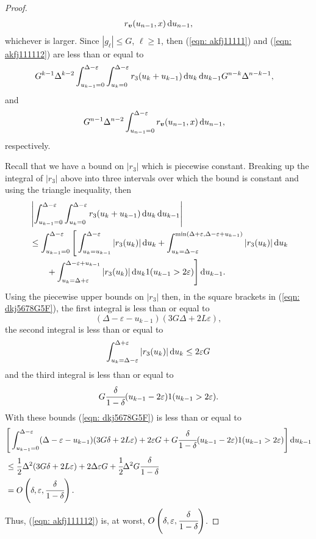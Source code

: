 \begin{proof}
\begin{align}
            	 r_{\boldsymbol v}(u_{n-1},x)\, \mathrm{d} u_{n-1},\label{eqn: akfj11111}
	\end{align} 
	whichever is larger. Since \(|g_\ell|\leq G\), \(\ell \geq 1\), then (\ref{eqn: akfj11111}) and (\ref{eqn: akfj111112}) are less than or equal to 
	\begin{align*}
		& G^{k-1} \Delta^{k-2} \int_{u_{k-1}=0}^{\Delta-\varepsilon}
		\int_{u_k=0}^{\Delta-\varepsilon }r_3(u_{k}+u_{k-1}) \, \mathrm{d} u_k \, \mathrm{d} u_{k-1} G^{n-k}\Delta^{n-k-1},
	\end{align*}
	and 
	\begin{align*}
		&G^{n-1} \Delta^{n-2} \int_{u_{n-1}=0}^{\Delta-\varepsilon}
		 r_{\boldsymbol v}(u_{n-1},x) \, \mathrm{d} u_{n-1},
	\end{align*} 
	respectively. 

	Recall that we have a bound on \(|r_3|\) which is piecewise constant. Breaking up the integral of \(|r_3|\) above into three intervals over which the bound is constant and using the triangle inequality, then
	\begin{align}
		 \nonumber &\left|\int_{u_{k-1}=0}^{\Delta-\varepsilon}\int_{u_k=0}^{\Delta-\varepsilon}r_3(u_{k}+u_{k-1}) \, \mathrm{d} u_k \, \mathrm{d} u_{k-1} \right|
		\\\nonumber & \leq \int_{u_{k-1}=0}^{\Delta-\varepsilon}\Bigg[ \int_{u_k=u_{k-1}}^{\Delta-\varepsilon} | r_3(u_k) |\, \mathrm{d} u_k + \int_{u_k=\Delta-\varepsilon}^{\min(\Delta+\varepsilon,\Delta-\varepsilon+u_{k-1})} |r_3(u_k)|\, \mathrm{d} u_k 
		\\&\qquad{}+ \int_{u_k = \Delta+\varepsilon}^{\Delta-\varepsilon+u_{k-1}} |r_3(u_{k})|\, \mathrm{d} u_k1(u_{k-1}>2\varepsilon)\Bigg] \, \mathrm{d} u_{k-1}.\label{eqn: dkj5678G5F}
	\end{align}
	Using the piecewise upper bounds on \(|r_3|\) then, in the square brackets in (\ref{eqn: dkj5678G5F}), the first integral is less than or equal to 
	\[(\Delta-\varepsilon-u_{k-1})(3G\Delta +2L\varepsilon),\]
	the second integral is less than or equal to 
	\[\int_{u_k=\Delta-\varepsilon}^{\Delta+\varepsilon} |r_3(u_k)|\, \mathrm{d} u_k \leq 2\varepsilon G \]
	and the third integral is less than or equal to 
	\[G\cfrac{\delta}{1-\delta}(u_{k-1}-2\varepsilon)1(u_{k-1}>2\varepsilon).\]
	With these bounds (\ref{eqn: dkj5678G5F}) is less than or equal to
	\begin{align*}
		&\Bigg[\int_{u_{k-1}=0}^{\Delta-\varepsilon} (\Delta-\varepsilon-u_{k-1})(3G\delta+2L\varepsilon)+ 2\varepsilon G 
		+ G\cfrac{\delta}{1-\delta}(u_{k-1}-2\varepsilon)1(u_{k-1}>2\varepsilon) \Bigg]\, \mathrm{d} u_{k-1}
		\\& \leq \frac{1}{2}\Delta^2(3G\delta+2L\varepsilon)+ 2\Delta\varepsilon G 
		+ \cfrac{1}{2}\Delta^2G\cfrac{\delta}{1-\delta} 
		\\&=O\left(\delta,\varepsilon,\cfrac{\delta}{1-\delta}\right).
	\end{align*}
	Thus, (\ref{eqn: akfj111112}) is, at worst, \(O\left(\delta,\varepsilon,\cfrac{\delta}{1-\delta}\right)\). 
	

\end{proof}
